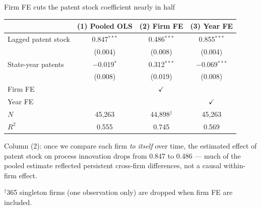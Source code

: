 \documentclass[aspectratio=169, 11pt]{beamer}
\begin{document}
\begin{frame}{Firm FE cuts the patent stock coefficient nearly in half}

\vspace{0.2cm}

\begin{table}
\centering\small
\begin{tabular}{@{}lccc@{}}
\toprule
& \textbf{(1) Pooled OLS} & \textbf{(2) Firm FE} & \textbf{(3) Year FE} \\
\midrule
Lagged patent stock
  & 0.847$^{***}$ & \alert{0.486$^{***}$} & 0.855$^{***}$ \\
  & \footnotesize(0.004) & \footnotesize(0.008) & \footnotesize(0.004) \\[6pt]
State-year patents
  & $-$0.019$^{*}$\phantom{**} & 0.312$^{***}$ & $-$0.069$^{***}$ \\
  & \footnotesize(0.008) & \footnotesize(0.019) & \footnotesize(0.008) \\
\midrule
Firm FE  & & $\checkmark$ & \\
Year FE  & & & $\checkmark$ \\
\midrule
$N$      & 45{,}263 & 44{,}898$^\dagger$ & 45{,}263 \\
$R^2$    & 0.555 & 0.745 & 0.569 \\
\bottomrule
\end{tabular}
\end{table}

\vspace{0.2cm}

Column (2): once we compare each firm \textit{to itself} over time, the
estimated effect of patent stock on process innovation
\alert{drops from 0.847 to 0.486} --- much of the pooled estimate
reflected persistent cross-firm differences, not a causal within-firm effect.

\vspace{0.15cm}
{\scriptsize $^\dagger$365 singleton firms (one observation only) are dropped when firm FE are included.}

\end{frame}
\end{document}
